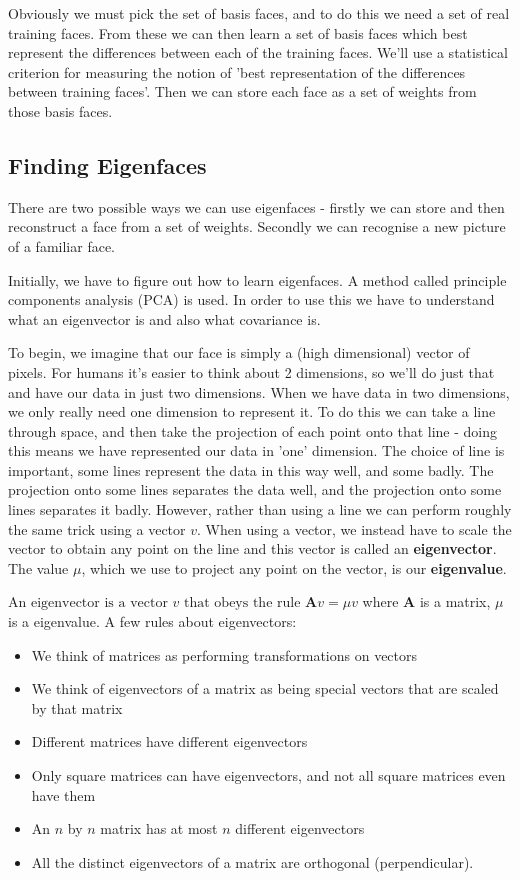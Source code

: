 \documentclass{article}
\begin{document}
	Obviously we must pick the set of basis faces, and to do this we need a set of real training faces. From these we can then learn a set of basis faces which best represent the differences between each of the training faces. We'll use a statistical criterion for measuring the notion of 'best representation of the differences between training faces'. Then we can store each face as a set of weights from those basis faces.
	
	\subsection{Finding Eigenfaces}
	There are two possible ways we can use eigenfaces - firstly we can store and then reconstruct a face from a set of weights. Secondly we can recognise a new picture of a familiar face.
	
	Initially, we have to figure out how to learn eigenfaces. A method called principle components analysis (PCA) is used. In order to use this we have to understand what an eigenvector is and also what covariance is.
	
	To begin, we imagine that our face is simply a (high dimensional) vector of pixels. For humans it's easier to think about 2 dimensions, so we'll do just that and have our data in just two dimensions. When we have data in two dimensions, we only really need one dimension to represent it. To do this we can take a line through space, and then take the projection of each point onto that line - doing this means we have represented our data in 'one' dimension. The choice of line is important, some lines represent the data in this way well, and some badly. The projection onto some lines separates the data well, and the projection onto some lines separates it badly. However, rather than using a line we can perform roughly the same trick using a vector $v$. When using a vector, we instead have to scale the vector to obtain any point on the line and this vector is called an \textbf{eigenvector}. The value $\mu$, which we use to project any point on the vector, is our \textbf{eigenvalue}.
	
		$\text{An eigenvector is a vector } v \text{ that obeys the rule } \mathbf{A}v = \mu v$ where $\mathbf{A}$ is a matrix, $\mu$ is a eigenvalue. A few rules about eigenvectors:
		\begin{itemize}
			\item We think of matrices as performing transformations on vectors
			\item We think of eigenvectors of a matrix as being special vectors that are scaled by that matrix
			\item Different matrices have different eigenvectors
			\item Only square matrices can have eigenvectors, and not all square matrices even have them
			\item An $n$ by $n$ matrix has at most $n$ different eigenvectors
			\item All the distinct eigenvectors of a matrix are orthogonal (perpendicular).
		\end{itemize}
		
\end{document}
